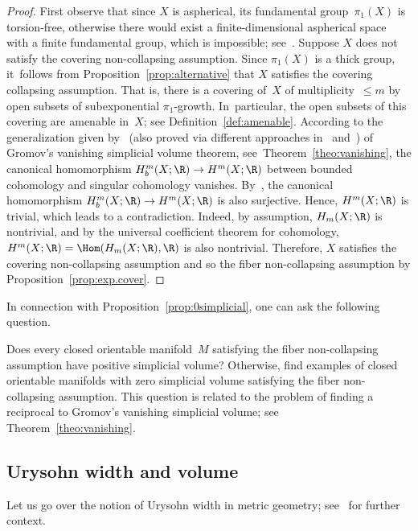 \begin{proof}
First observe that since $X$ is aspherical, its fundamental group~$\pi_1(X)$ is torsion-free, otherwise there would exist a finite-dimensional aspherical space with a finite fundamental group, which is impossible; see~\cite[Prop.\,2.45]{hatcher}.
Suppose $X$ does not satisfy the covering non-collapsing assumption.
Since $\pi_1(X)$ is a thick group, it~follows from Proposition~\ref{prop:alternative} that $X$ satisfies the covering collapsing assumption.
That is, there is a covering of~$X$ of multiplicity~$\leq m$ by open subsets of subexponential $\pi_1$-growth. In~particular, the open subsets of this covering are amenable in~$X$; see Definition~\ref{def:amenable}.
According to the generalization given by~\cite[Th.\,9.2]{Ivanov80} (also proved via different approaches in~\cite{FM} and~\cite{LS}) of Gromov's vanishing simplicial volume theorem, see~Theorem~\ref{theo:vanishing}, the canonical homomorphism $H_b^m(X;\R) \to H^m(X;\R)$ between bounded cohomology and singular cohomology vanishes.
By~\cite{mineyev}, the canonical homomorphism $H_b^m(X;\R) \to H^m(X;\R)$ is also surjective.
Hence, $H^m(X;\R)$ is trivial, which leads to a contradiction.
Indeed, by assumption, $H_m(X;\R)$ is nontrivial, and by the universal coefficient theorem for cohomology, $H^m(X;\R) = \Hom(H_m(X;\R),\R)$ is also nontrivial.
Therefore, $X$ satisfies the covering non-collapsing assumption and so the fiber non-collapsing assumption by Proposition~\ref{prop:exp.cover}.
\end{proof}

In connection with Proposition~\ref{prop:0simplicial}, one can ask the following question.

\begin{question}
Does every closed orientable manifold~$M$ satisfying the fiber non-collapsing assumption have positive simplicial volume?
Otherwise, find examples of closed orientable manifolds with zero simplicial volume satisfying the fiber non-collapsing assumption.
This question is related to the problem of finding a reciprocal to Gromov's vanishing simplicial volume; see Theorem~\ref{theo:vanishing}.
\end{question}

\subsection{Urysohn width and volume}

Let us go over the notion of Urysohn width in metric geometry; see~\cite{gro88} for further context.

